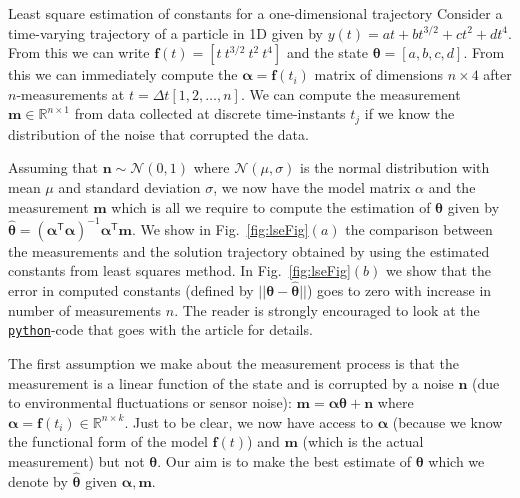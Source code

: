 \documentclass{resonance}
\def\R{\mathbb{R}}
\def\th{\bm{\theta}}
\def\thh{\bm{\hat{\theta}}}
\def\n{\bm{n}}
\def\f{\bm{f}}
\def\m{\bm{m}}
\def\T{\mathsf{T}}
\def\H{\bm{\alpha}}
\begin{document}
\begin{egsBox}[label=egs:lse]{Least square estimation of constants for a one-dimensional trajectory}
\footnotesize
Consider a time-varying trajectory of a particle in 1D given by $y(t) = a t + b t^{3/2} + c t^2 + d t^4$. From this we can write $\f(t) = [ t\ t^{3/2}\ t^2\ t^4]$ and the state $\th = [ a, b, c, d]$. From this we can immediately compute the $\H = \f(t_i)$ matrix of dimensions $n \times 4$ after $n$-measurements at $t = \Delta t [ 1, 2, \dots, n]$. We can compute the measurement $\m \in \R^{n \times 1}$ from data collected at discrete time-instants $t_j$ if we know the distribution of the noise that corrupted the data.

Assuming that $\n \sim \mathcal{N}(0,1)$ where $\mathcal{N}(\mu, \sigma)$ is the normal distribution with mean $\mu$ and standard deviation $\sigma$, we now have the model matrix $\alpha$ and the measurement $\m$ which is all we require to compute the estimation of $\th$ given by $\thh = (\H^\T \H)^{-1} \H^\T \m$. We show in Fig.~\ref{fig:lseFig}$(a)$ the comparison between the measurements and the solution trajectory obtained by using the estimated constants from least squares method. In Fig.~\ref{fig:lseFig}$(b)$ we show that the error in computed constants (defined by $||\th-\thh||$) goes to zero with increase in number of measurements $n$. The reader is strongly encouraged to look at the \href{https://github.com/sgangaprasath/KFTutorial/blob/main/KFTutorial.ipynb}{\texttt{python}}-code that goes with the article for details.
\end{egsBox}

The first assumption we make about the measurement process is that the measurement is a linear function of the state and is corrupted by a noise $\n$ (due to environmental fluctuations or sensor noise): $\m = \H \th + \n$ where $\H = \f(t_i) \in \R^{n \times k}$. Just to be clear, we now have access to $\H$ (because we know the functional form of the model $\f(t)$) and $\m$ (which is the actual measurement) but not $\th$. Our aim is to make the best estimate of $\th$ which we denote by $\thh$ given $\H, \m$. 
\end{document}
